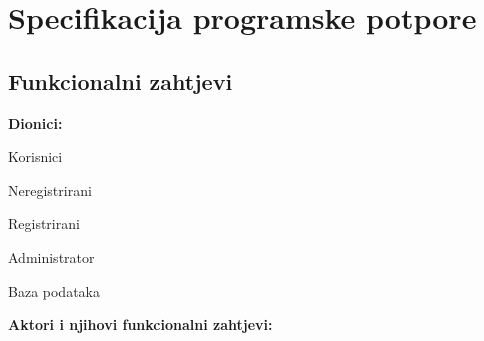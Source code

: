 \chapter{Specifikacija programske potpore}
		
	\section{Funkcionalni zahtjevi}
			
%			
%				
			
			
			\noindent \textbf{Dionici:}
			
			\begin{packed_enum}
				
				\item Korisnici
				
					\begin{packed_enum}
					
						\item Neregistrirani
						\item Registrirani
						
					\end{packed_enum}
					
				\item Administrator
				\item Baza podataka
				
			\end{packed_enum}
			
			\noindent \textbf{Aktori i njihovi funkcionalni zahtjevi:}
			
